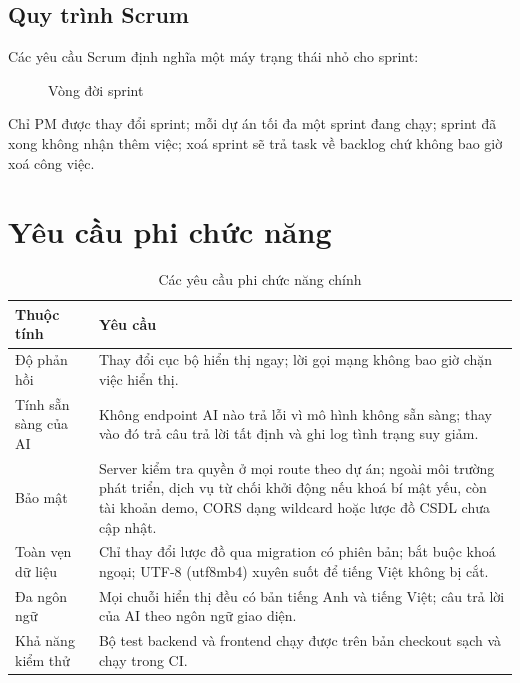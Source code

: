\documentclass[../main.tex]{subfiles}
\begin{document}
\subsection{Quy trình Scrum}
Các yêu cầu Scrum định nghĩa một máy trạng thái nhỏ cho sprint:
\begin{figure}[H]
\centering
{}
\caption{Vòng đời sprint}\label{fig:sprint-states}
\end{figure}
Chỉ PM được thay đổi sprint; mỗi dự án tối đa một sprint đang chạy; sprint đã xong không nhận thêm
việc; xoá sprint sẽ trả task về backlog chứ không bao giờ xoá công việc.

\section{Yêu cầu phi chức năng}
\begin{table}[H]
\centering
\caption{Các yêu cầu phi chức năng chính}\label{tab:nfr}
\renewcommand{\arraystretch}{1.25}
\begin{tabular}{|p{2.9cm}|p{10.8cm}|}
\hline
\textbf{Thuộc tính} & \textbf{Yêu cầu} \\ \hline
Độ phản hồi & Thay đổi cục bộ hiển thị ngay; lời gọi mạng không bao giờ chặn việc hiển thị. \\ \hline
Tính sẵn sàng của AI & Không endpoint AI nào trả lỗi vì mô hình không sẵn sàng; thay vào đó trả câu trả lời tất định và ghi log tình trạng suy giảm. \\ \hline
Bảo mật & Server kiểm tra quyền ở mọi route theo dự án; ngoài môi trường phát triển, dịch vụ từ chối khởi động nếu khoá bí mật yếu, còn tài khoản demo, CORS dạng wildcard hoặc lược đồ CSDL chưa cập nhật. \\ \hline
Toàn vẹn dữ liệu & Chỉ thay đổi lược đồ qua migration có phiên bản; bắt buộc khoá ngoại; UTF-8 (utf8mb4) xuyên suốt để tiếng Việt không bị cắt. \\ \hline
Đa ngôn ngữ & Mọi chuỗi hiển thị đều có bản tiếng Anh và tiếng Việt; câu trả lời của AI theo ngôn ngữ giao diện. \\ \hline
Khả năng kiểm thử & Bộ test backend và frontend chạy được trên bản checkout sạch và chạy trong CI. \\ \hline
\end{tabular}
\end{table}
\end{document}

